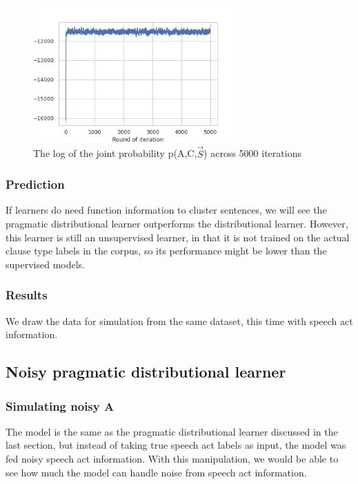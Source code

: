 \begin{figure}[H]
    \centering
    \includegraphics[width=0.7\textwidth]{figures/target-iters.jpg}
    \caption{The log of the joint probability p(A,C,$\vec{S}$) across 5000 iterations}
    \label{fig:target-iters}
\end{figure}




\subsubsection{Prediction}
\label{sec:engcl:model:prag:predict}


If learners do need function information to cluster sentences, we will see the pragmatic distributional learner outperforms the distributional learner. However, this learner is still an unsupervised learner, in that it is not trained on the actual clause type labels in the corpus, so its performance might be lower than the supervised models.



\subsubsection{Results}
\label{sec:engcl:model:prag:results}

We draw the data for simulation from the same dataset, this time with speech act information. 
\subsection{Noisy pragmatic distributional learner}
\label{sec:engcl:model:noisy}

\subsubsection{Simulating noisy A}
The model is the same as the pragmatic distributional learner discussed in the last section, but instead of taking true speech act labels as input, the model was fed noisy speech act information. With this manipulation, we would be able to see how much the model can handle noise from speech act information. 




